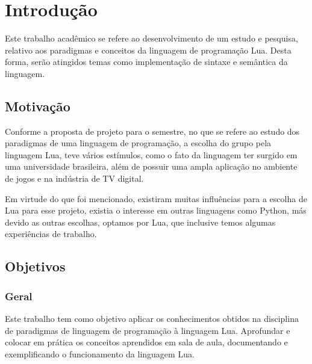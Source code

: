 \documentclass[
12pt, %
openright, %
oneside, %
a4paper, %
english, %
brazil, %
]{abntex2}
\begin{document}
\textual

\chapter{Introdução}
Este trabalho acadêmico se refere ao desenvolvimento de um estudo e pesquisa, relativo aos paradigmas e conceitos da linguagem de programação Lua. Desta forma, serão atingidos temas como implementação de sintaxe e semântica da linguagem.

\section{Motivação}
Conforme a proposta de projeto para o semestre, no que se refere ao estudo dos paradigmas de uma linguagem de programação, a escolha do grupo pela linguagem Lua, teve vários estímulos, como o fato da linguagem ter surgido em uma universidade brasileira, além de possuir uma ampla aplicação no ambiente de jogos e na indústria de TV digital.

Em virtude do que foi mencionado, existiram muitas influências para a escolha de Lua para esse projeto, existia o interesse em outras linguagens como Python, más devido as outras escolhas, optamos por Lua, que inclusive temos algumas experiências de trabalho.

\section{Objetivos}

\subsection{Geral}
Este trabalho tem como objetivo aplicar os conhecimentos obtidos na disciplina de paradigmas de linguagem de programação à linguagem Lua. Aprofundar e colocar em prática os conceitos aprendidos em sala de aula, documentando e exemplificando o funcionamento da linguagem Lua.
\end{document}
